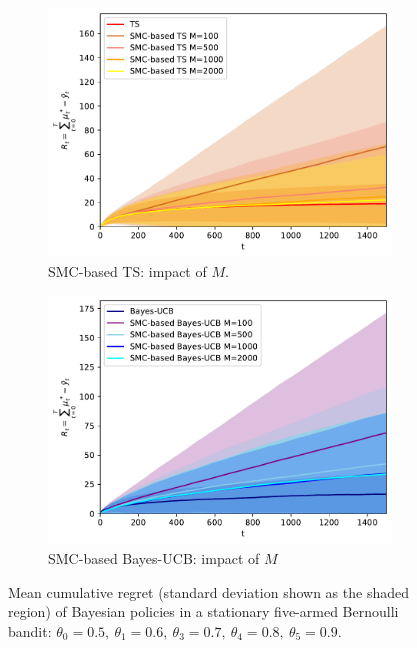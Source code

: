 \begin{figure}[!h]
	\begin{subfigure}[b]{0.46\textwidth}
		\centering
		\includegraphics[width=\textwidth]{./fods_figs/static/bernoulli/A5/theta0.5_0.6_0.7_0.8_0.9_allM_cumulative_regret_ts}
		\caption{SMC-based TS: impact of $M$.}
	\end{subfigure}
	\begin{subfigure}[b]{0.46\textwidth}
		\centering
		\includegraphics[width=\textwidth]{./fods_figs/static/bernoulli/A5/theta0.5_0.6_0.7_0.8_0.9_allM_cumulative_regret_bucb}
		\caption{SMC-based Bayes-UCB: impact of $M$}
	\end{subfigure}
	
	\caption{Mean cumulative regret (standard deviation shown as the shaded region) of Bayesian policies in a stationary five-armed Bernoulli bandit:
		 $\theta_0=0.5, \ \theta_1=0.6, \ \theta_3=0.7, \ \theta_4=0.8, \ \theta_5=0.9$.
	}
\end{figure}